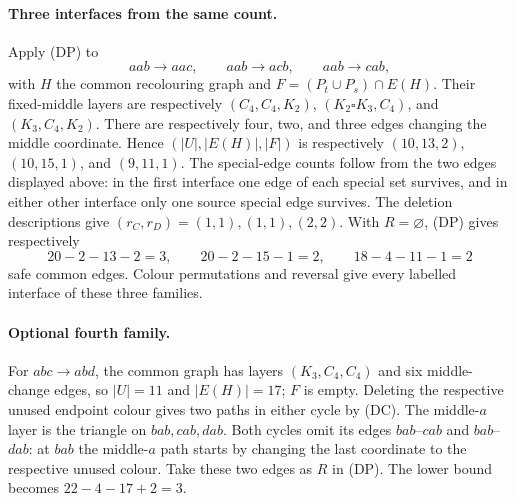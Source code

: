 \paragraph{Three interfaces from the same count.}
Apply (DP) to
\[
 aab\to aac,\qquad aab\to acb,\qquad aab\to cab,
\]
with $H$ the common recolouring graph and
$F=(P_t\cup P_s)\cap E(H)$. Their fixed-middle layers are respectively
$(C_4,C_4,K_2)$, $(K_2\square K_3,C_4)$, and $(K_3,C_4,K_2)$.
There are respectively four, two, and three edges changing the middle
coordinate. Hence $(|U|,|E(H)|,|F|)$ is respectively
$(10,13,2)$, $(10,15,1)$, and $(9,11,1)$.
The special-edge counts follow from the two edges displayed above:
in the first interface one edge of each special set survives, and in
either other interface only one source special edge survives.
The deletion descriptions give $(r_C,r_D)=(1,1),(1,1),(2,2)$.
With $R=\varnothing$, (DP) gives respectively
\[
20-2-13-2=3,\qquad 20-2-15-1=2,\qquad 18-4-11-1=2
\]
safe common edges. Colour permutations and reversal give every labelled
interface of these three families.

\paragraph{Optional fourth family.}
For $abc\to abd$, the common graph has layers $(K_3,C_4,C_4)$ and
six middle-change edges, so $|U|=11$ and $|E(H)|=17$; $F$ is empty.
Deleting the respective unused endpoint colour gives two paths in
either cycle by (DC). The middle-$a$ layer is the triangle on
$bab,cab,dab$. Both cycles omit its edges $bab$--$cab$ and
$bab$--$dab$: at $bab$ the middle-$a$ path starts by changing the
last coordinate to the respective unused colour. Take these two edges
as $R$ in (DP). The lower bound becomes $22-4-17+2=3$.

